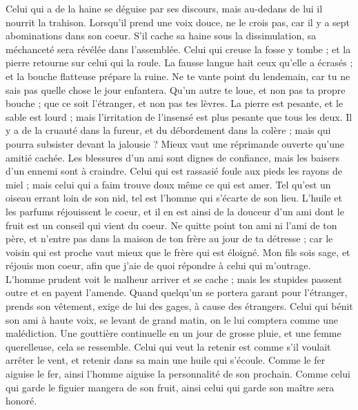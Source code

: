 \begin{multicols}{2}
Celui qui a de la haine se déguise par ses discours, mais au-dedans de lui il nourrit la trahison.
Lorsqu’il prend une voix douce, ne le crois pas, car il y a sept abominations dans son coeur.
S’il cache sa haine sous la dissimulation, sa méchanceté sera révélée dans l'assemblée.
Celui qui creuse la fosse y tombe ; et la pierre retourne sur celui qui la roule.
La fausse langue hait ceux qu'elle a écrasés ; et la bouche flatteuse prépare la ruine.
\VerseOne{}Ne te vante point du lendemain, car tu ne sais pas quelle chose le jour enfantera.
Qu'un autre te loue, et non pas ta propre bouche ; que ce soit l'étranger, et non pas tes lèvres.
La pierre est pesante, et le sable est lourd ; mais l’irritation de l’insensé est plus pesante que tous les deux.
Il y a de la cruauté dans la fureur, et du débordement dans la colère ; mais qui pourra subsister devant la jalousie ?
Mieux vaut une réprimande ouverte qu'une amitié cachée.
Les blessures d’un ami sont dignes de confiance, mais les baisers d’un ennemi sont à craindre.
Celui qui est rassasié foule aux pieds les rayons de miel ; mais celui qui a faim trouve doux même ce qui est amer.
Tel qu'est un oiseau errant loin de son nid, tel est l'homme qui s'écarte de son lieu.
L'huile et les parfums réjouissent le coeur, et il en est ainsi de la douceur d'un ami dont le fruit est un conseil qui vient du coeur.
Ne quitte point ton ami ni l'ami de ton père, et n'entre pas dans la maison de ton frère au jour de ta détresse ; car le voisin qui est proche vaut mieux que le frère qui est éloigné.
Mon fils sois sage, et réjouis mon coeur, afin que j'aie de quoi répondre à celui qui m’outrage.
L'homme prudent voit le malheur arriver et se cache ; mais les stupides passent outre et en payent l'amende.
Quand quelqu'un se portera garant pour l'étranger, prends son vêtement, exige de lui des gages, à cause des étrangers.
Celui qui bénit son ami à haute voix, se levant de grand matin, on le lui comptera comme une malédiction.
Une gouttière continuelle en un jour de grosse pluie, et une femme querelleuse, cela se ressemble.
Celui qui veut la retenir est comme s’il voulait arrêter le vent, et retenir dans sa main une huile qui s’écoule.
Comme le fer aiguise le fer, ainsi l'homme aiguise la personnalité de son prochain.
Comme celui qui garde le figuier  mangera de son fruit, ainsi celui qui garde son maître sera honoré.

\end{multicols}
